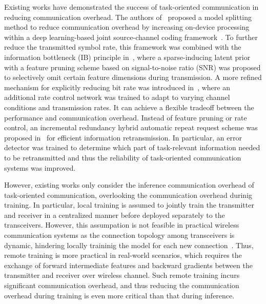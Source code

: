 Existing works have demonstrated the success of task-oriented communication in reducing communication overhead. The authors of~\cite{bottlenet} proposed a model splitting method to reduce communication overhead by increasing on-device processing within a deep learning-based joint source-channel coding framework~\cite{jssc_deniz}. To further reduce the transmitted symbol rate, this framework was combined with the information bottleneck (IB) principle in~\cite{vfe}, where a sparse-inducing latent prior with a feature pruning scheme based on signal-to-noise ratio (SNR) was proposed to selectively omit certain feature dimensions during transmission.
A more refined mechanism for explicitly reducing bit rate was introduced in~\cite{yang2024swinjscc}, where an additional rate control network was trained to adapt to varying channel conditions and transmission rates. It can achieve a flexible tradeoff between the performance and communication overhead. 
Instead of feature pruning or rate control, an incremental redundancy hybrid automatic repeat request scheme was proposed in~\cite{jiang2022wireless} for efficient information retransmission. In particular, an error detector was trained to determine which part of task-relevant information needed to be retransmitted and thus the reliability of task-oriented communication systems was improved.


However, existing works only consider the inference communication overhead of task-oriented communication, overlooking the communication overhead durinig training. In particular, local training is assumed to jointly train the transmitter and receiver in a centralized manner before deployed separately to the transceivers. However, this assumpation is not feasible in practical wireless communication systems as the connection topology among transceivers is dynamic, hindering locally traininig the model for each new connection~\cite{zhang2022toward}. Thus, remote training is more practical in real-world scenarios, which requires the exchange of forward intermediate features and backward gradients between the transmitter and receiver over wireless channel. Such remote training incurs significant communication overhead, and thus reducing the communication overhead during training is even more critical than that during inference.

